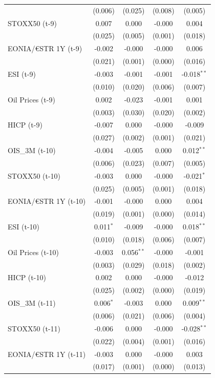 \begin{longtable}[t]{lcccc}
 & (0.006) & (0.025) & (0.008) & (0.005)\\
STOXX50 (t-9) & 0.007 & 0.000 & -0.000 & 0.004\\
 & (0.025) & (0.005) & (0.001) & \vphantom{1} (0.018)\\
EONIA/€STR 1Y (t-9) & -0.002 & -0.000 & -0.000 & 0.006\\
 & (0.021) & (0.001) & (0.000) & \vphantom{1} (0.016)\\
ESI (t-9) & -0.003 & -0.001 & -0.001 & -0.018$^{**}$\\
 & (0.010) & (0.020) & (0.006) & (0.007)\\
Oil Prices (t-9) & 0.002 & -0.023 & -0.001 & 0.001\\
 & (0.003) & (0.030) & (0.020) & (0.002)\\
HICP (t-9) & -0.007 & 0.000 & -0.000 & -0.009\\
 & (0.027) & (0.002) & (0.001) & (0.021)\\
OIS\_3M (t-10) & -0.004 & -0.005 & 0.000 & 0.012$^{**}$\\
 & (0.006) & (0.023) & (0.007) & (0.005)\\
STOXX50 (t-10) & -0.003 & 0.000 & -0.000 & -0.021$^{*}$\\
 & (0.025) & (0.005) & (0.001) & (0.018)\\
EONIA/€STR 1Y (t-10) & -0.001 & -0.000 & 0.000 & 0.004\\
 & (0.019) & (0.001) & (0.000) & (0.014)\\
ESI (t-10) & 0.011$^{*}$ & -0.009 & -0.000 & 0.018$^{**}$\\
 & (0.010) & (0.018) & (0.006) & (0.007)\\
Oil Prices (t-10) & -0.003 & 0.056$^{**}$ & -0.000 & -0.001\\
 & (0.003) & (0.029) & (0.018) & (0.002)\\
HICP (t-10) & 0.002 & 0.000 & -0.000 & -0.012\\
 & (0.025) & (0.002) & (0.000) & (0.019)\\
OIS\_3M (t-11) & 0.006$^{*}$ & -0.003 & 0.000 & 0.009$^{**}$\\
 & (0.006) & (0.021) & (0.006) & (0.004)\\
STOXX50 (t-11) & -0.006 & 0.000 & -0.000 & -0.028$^{**}$\\
 & (0.022) & (0.004) & (0.001) & \vphantom{1} (0.016)\\
EONIA/€STR 1Y (t-11) & -0.003 & 0.000 & -0.000 & 0.003\\
 & (0.017) & (0.001) & (0.000) & (0.013)\\

\end{longtable}
